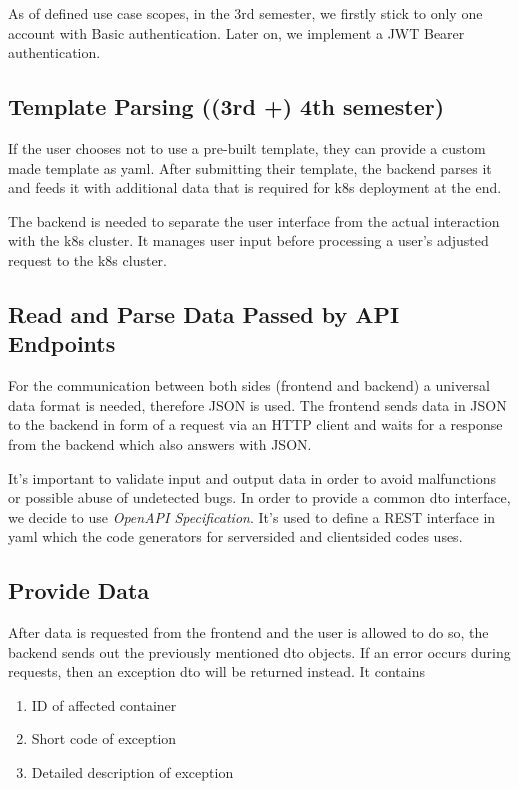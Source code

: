 \documentclass[a4paper,12pt,chapterprefix=false,bibliography=totoc,listof=totoc,]{scrreprt}
\begin{document}
As of defined use case scopes, in the 3rd semester, we firstly stick to only one account with Basic authentication. Later on, we implement a JWT Bearer authentication.

\subsection{Template Parsing ((3rd +) 4th semester)}
If the user chooses not to use a pre-built template, they can provide a custom made template as \gls{yaml}. After submitting their template, the backend parses it and feeds it with additional data that is required for \gls{k8s} deployment at the end. 

The backend is needed to separate the user interface from the actual interaction with the \gls{k8s} cluster. It manages user input before processing a user's adjusted request to the \gls{k8s} cluster.


\subsection{Read and Parse Data Passed by API Endpoints}
For the communication between both sides (frontend and backend) a universal data format is needed, therefore JSON is used. The frontend sends data in JSON to the backend in form of a request via an HTTP client and waits for a response from the backend which also answers with JSON.

It's important to validate input and output data in order to avoid malfunctions or possible abuse of undetected bugs. In order to provide a common \gls{dto} interface, we decide to use \textit{OpenAPI Specification}. It's used to define a REST interface in \gls{yaml} which the code generators for serversided and clientsided codes uses.

\subsection{Provide Data}
After data is requested from the frontend and the user is allowed to do so, the backend sends out the previously mentioned \gls{dto} objects. If an error occurs during requests, then an exception \gls{dto} will be returned instead. It contains
\begin{enumerate}
	\item ID of affected container
	\item Short code of exception
	\item Detailed description of exception
\end{enumerate} 
\end{document}
